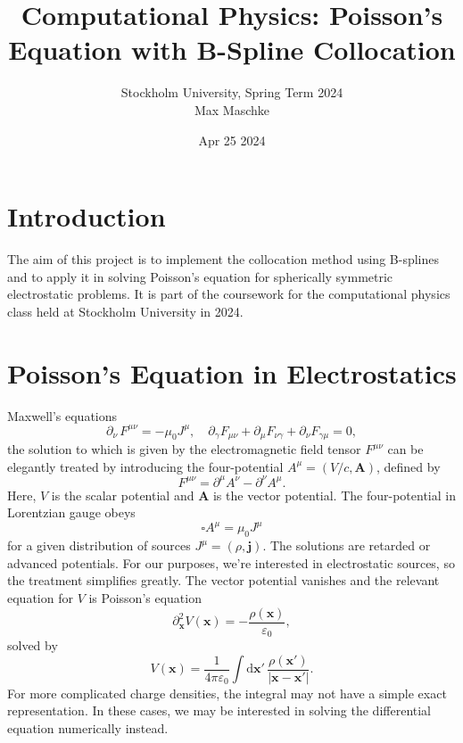 \documentclass[a4paper,DIV=12,english]{scrartcl}
\title{Computational Physics: Poisson's Equation with B-Spline Collocation}
\author{Stockholm University, Spring Term 2024 \\Max Maschke}
\date{Apr 25 2024}
\begin{document}
\maketitle


\tableofcontents
\newpage


\newpage
\section{Introduction}
The aim of this project is to implement the collocation method using B-splines and to apply it in solving Poisson's equation for spherically symmetric electrostatic problems. It is part of the coursework for the computational physics class held at Stockholm University in 2024.

\section{Poisson's Equation in Electrostatics}
Maxwell's equations
\begin{equation}
    \partial_\nu \, F^{\mu\nu} = -\mu_0 J^\mu,\quad \partial_\gamma F_{\mu\nu} + \partial_\mu F_{\nu\gamma} + \partial_\nu F_{\gamma\mu} = 0,
\end{equation}
the solution to which is given by the electromagnetic field tensor $F^{\mu\nu}$ can be elegantly treated by introducing the four-potential $A^\mu = (V/c, \textbf{A})$, defined by
\begin{equation}
    F^{\mu\nu} = \partial^\mu A^\nu - \partial^\nu A^\mu. 
\end{equation}
Here, $V$ is the scalar potential and $\textbf{A}$ is the vector potential. The four-potential in Lorentzian gauge obeys
\begin{equation}
    \square A^\mu = \mu_0 J^\mu
\end{equation}
for a given distribution of sources $J^\mu = (\rho, \textbf{j})$. The solutions are retarded or advanced potentials. For our purposes, we're interested in electrostatic sources, so the treatment simplifies greatly. The vector potential vanishes and the relevant equation for $V$ is Poisson's equation
\begin{equation}\label{eq:poisson}
    \partial_\textbf{x}^2 V(\textbf{x}) = -\frac{\rho(\textbf{x})}{\varepsilon_0},
\end{equation}
solved by
\begin{equation}
    V(\textbf{x}) = \frac{1}{4\pi\varepsilon_0} \int \text{d}\textbf{x}'\, \frac{\rho(\textbf{x}')}{\left|\textbf{x}-\textbf{x}'\right|}.
\end{equation}
For more complicated charge densities, the integral may not have a simple exact representation. In these cases, we may be interested in solving the differential equation numerically instead.
\end{document}
